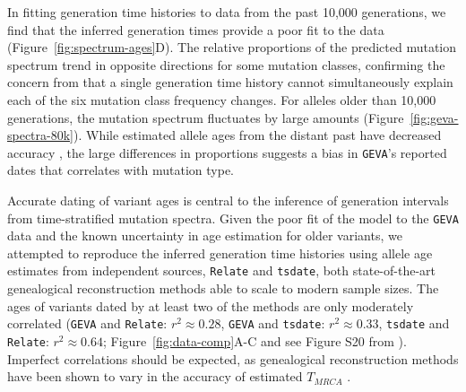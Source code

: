 \documentclass[]{article}
\newcommand{\GEVA}{\texttt{GEVA}\xspace}
\newcommand{\tsdate}{\texttt{tsdate}\xspace}
\newcommand{\relate}{\texttt{Relate}\xspace}
\begin{document}
In fitting generation time histories to data from the past 10,000 generations,
we find that the inferred generation times provide a poor fit to the data
(Figure~\ref{fig:spectrum-ages}D). The relative proportions of the predicted
mutation spectrum trend in opposite directions for some mutation classes,
confirming the concern from \citet{gao2023limited} that a single generation
time history cannot simultaneously explain each of the six mutation class
frequency changes. For alleles older than 10,000 generations, the mutation
spectrum fluctuates by large amounts (Figure~\ref{fig:geva-spectra-80k}). While
estimated allele ages from the distant past have decreased accuracy
\citep{albers2020dating,wang2023human}, the large differences in proportions
suggests a bias in \GEVA's reported dates that correlates with mutation type.

Accurate dating of variant ages is central to the inference of generation
intervals from time-stratified mutation spectra.
Given the poor fit of the model to the \GEVA data and the known uncertainty in
age estimation for older variants, we attempted to reproduce the inferred
generation time histories using allele age estimates from independent sources,
\relate \citep{speidel2019method} and \tsdate \citep{wohns2022unified}, both
state-of-the-art genealogical reconstruction methods able to scale to modern sample sizes. 
The ages of variants
dated by at least two of the methods are only moderately correlated (\GEVA and
\relate: $r^2 \approx 0.28$, \GEVA and \tsdate: $r^2 \approx 0.33$, \tsdate
and \relate: $r^2 \approx 0.64$; Figure~\ref{fig:data-comp}A-C and see Figure
S20 from \citet{wohns2022unified}). Imperfect correlations should be expected,
as genealogical reconstruction methods have been shown to vary in the accuracy
of estimated $T_{MRCA}$ \citep{brandt2022evaluation}.
\end{document}
